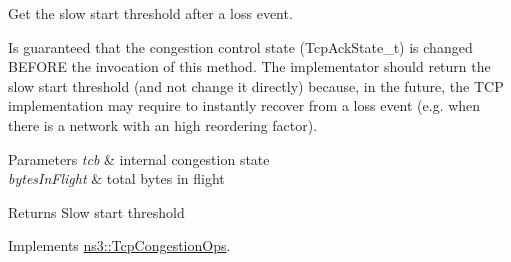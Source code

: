 Get the slow start threshold after a loss event. 

Is guaranteed that the congestion control state (Tcp\+Ack\+State\+\_\+t) is changed B\+E\+F\+O\+RE the invocation of this method. The implementator should return the slow start threshold (and not change it directly) because, in the future, the T\+CP implementation may require to instantly recover from a loss event (e.\+g. when there is a network with an high reordering factor).


\begin{DoxyParams}{Parameters}
{\em tcb} & internal congestion state \\
\hline
{\em bytes\+In\+Flight} & total bytes in flight \\
\hline
\end{DoxyParams}
\begin{DoxyReturn}{Returns}
Slow start threshold 
\end{DoxyReturn}


Implements \hyperlink{classns3_1_1TcpCongestionOps_a504ab8e79dbf8e11c1f2b7120977a8c5}{ns3\+::\+Tcp\+Congestion\+Ops}.


